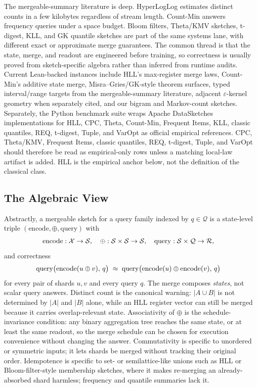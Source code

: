The mergeable-summary literature is deep. HyperLogLog
\citep{FlajoletEtAl2007,HeuleEtAl2013} estimates distinct counts in a few
kilobytes regardless of stream length. Count-Min
\citep{CormodeMuthukrishnan2005} answers frequency queries under a space
budget. Bloom filters, Theta/KMV sketches, t-digest, KLL, and GK quantile
sketches are part of the same systems lane, with different exact or
approximate merge guarantees. The common thread is that the state,
merge, and readout are engineered before training, so correctness is
usually proved from sketch-specific algebra rather than inferred from
runtime audits. Current Lean-backed instances include HLL's max-register merge
laws, Count-Min's additive state merge, Misra--Gries/GK-style theorem surfaces,
typed interval/range targets from the mergeable-summary literature, adjacent
$\varepsilon$-kernel geometry when separately cited, and our bigram
and Markov-count sketches. Separately, the Python benchmark suite wraps
Apache DataSketches implementations for HLL, CPC, Theta, Count-Min,
Frequent Items, KLL, classic quantiles, REQ, t-digest, Tuple, and VarOpt
as official empirical references. CPC, Theta/KMV, Frequent Items, classic
quantiles, REQ, t-digest, Tuple, and VarOpt should therefore be read as
empirical-only rows unless a matching local-law artifact is added. HLL is
the empirical anchor below, not the definition of the classical class.

\subsection{The Algebraic View}

Abstractly, a mergeable sketch for a query family indexed by $q \in \mathcal{Q}$
is a state-level triple $(\mathrm{encode}, \oplus, \mathrm{query})$ with
\[
\mathrm{encode} : \mathcal{X} \to \mathcal{S}, \quad
\oplus : \mathcal{S} \times \mathcal{S} \to \mathcal{S}, \quad
\mathrm{query} : \mathcal{S} \times \mathcal{Q} \to \mathcal{R},
\]
and correctness
\[
\mathrm{query}\big(\mathrm{encode}(u \oplus v),\, q\big)
\;\approx\;
\mathrm{query}\big(\mathrm{encode}(u) \oplus \mathrm{encode}(v),\, q\big)
\]
for every pair of shards $u, v$ and every query $q$. The merge composes
\emph{states}, not scalar query answers. Distinct count is the canonical
warning: $|A \cup B|$ is not determined by $|A|$ and $|B|$ alone, while an
HLL register vector can still be merged because it carries overlap-relevant
state. Associativity of $\oplus$ is the schedule-invariance condition: any
binary aggregation tree reaches the same state, or at least the same readout,
so the merge schedule can be chosen for execution convenience without
changing the answer. Commutativity is specific to unordered or symmetric
inputs; it lets shards be merged without tracking their original order.
Idempotence is specific to set- or semilattice-like unions such as HLL or
Bloom-filter-style membership sketches, where it makes re-merging an
already-absorbed shard harmless; frequency and quantile summaries lack it.

